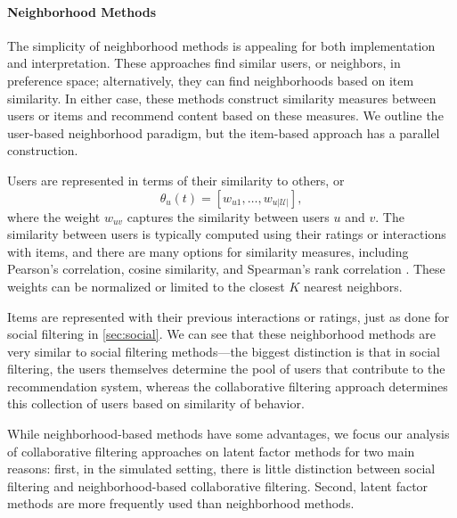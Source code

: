 \documentclass[sigconf]{acmart}
\begin{document}
\paragraph{Neighborhood Methods}
The simplicity of neighborhood methods \citep[ch. 4]{RSH} is appealing for both implementation and interpretation.  These approaches find similar users, or neighbors, in preference space; alternatively, they can find neighborhoods based on item similarity.  In either case, these methods construct similarity measures between users or items and recommend content based on these measures.  We outline the user-based neighborhood paradigm, but the item-based approach has a parallel construction.

Users are represented in terms of their similarity to others, or
\begin{equation}
\theta_{u}(t) = \left[w_{u1}, \dots, w_{u \vert\mathcal{U}\vert}\right],
\end{equation}
where the weight $w_{uv}$ captures the similarity between users $u$ and $v$.  The similarity between users is typically computed using their ratings or interactions with items, and there are many options for similarity measures, including Pearson's correlation, cosine similarity, and Spearman's rank correlation \cite{ahn2008new}.  These weights can be normalized or limited to the closest $K$ nearest neighbors.

Items are represented with their previous interactions or ratings, just as done for social filtering in \cref{sec:social}.  We can see that these neighborhood methods are very similar to social filtering methods---the biggest distinction is that in social filtering, the users themselves determine the pool of users that contribute to the recommendation system, whereas the collaborative filtering approach determines this collection of users based on similarity of behavior.

While neighborhood-based methods have some advantages, we focus our analysis of collaborative filtering approaches on latent factor methods for two main reasons: first, in the simulated setting, there is little distinction between social filtering and neighborhood-based collaborative filtering.  Second, latent factor methods are more frequently used than neighborhood methods.
\end{document}
